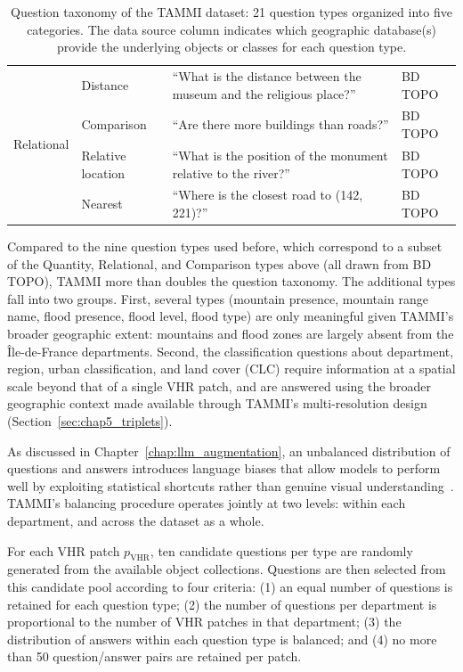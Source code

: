 \begin{table}[ht]
\begin{tabularx}{\textwidth}{l l >{\raggedright\arraybackslash}X l}
\midrule
\multirow{4}{*}{Relational}
  & Distance         & ``What is the distance between the museum and the religious place?'' & BD TOPO \\
  & Comparison       & ``Are there more buildings than roads?''                             & BD TOPO \\
  & Relative location& ``What is the position of the monument relative to the river?''      & BD TOPO \\
  & Nearest          & ``Where is the closest road to (142, 221)?''                         & BD TOPO \\
\bottomrule
\end{tabularx}
\caption{Question taxonomy of the TAMMI dataset: 21 question
types organized into five categories. The data source column
indicates which geographic database(s) provide the underlying
objects or classes for each question type.}
\label{tab:chap5_qtypes}
\end{table}

Compared to the nine question types used before, which correspond to a
subset of the Quantity, Relational, and Comparison types
above (all drawn from BD TOPO), TAMMI more than doubles the
question taxonomy. The additional types fall into two groups.
First, several types (mountain presence, mountain range name,
flood presence, flood level, flood type) are only meaningful
given TAMMI's broader geographic extent: mountains and flood
zones are largely absent from the Île-de-France departments. Second, the
classification questions about department, region, urban
classification, and land cover (CLC) require information at a
spatial scale beyond that of a single VHR patch, and are
answered using the broader geographic context made available
through TAMMI's multi-resolution design
(Section~\ref{sec:chap5_triplets}).
\label{sec:chap5_balancing}

As discussed in Chapter~\ref{chap:llm_augmentation}, an
unbalanced distribution of questions and answers introduces
language biases that allow models to perform well by
exploiting statistical shortcuts rather than genuine visual
understanding~\cite{chappuis2025langbias}. TAMMI's balancing
procedure operates jointly at two levels: within each
department, and across the dataset as a whole.

For each VHR patch $p_\text{VHR}$, ten candidate questions per
type are randomly generated from the available object
collections. Questions are then selected from this candidate
pool according to four criteria: (1) an equal number of
questions is retained for each question type; (2) the number
of questions per department is proportional to the number of
VHR patches in that department; (3) the distribution of
answers within each question type is balanced; and (4) no
more than 50 question/answer pairs are retained per patch.

